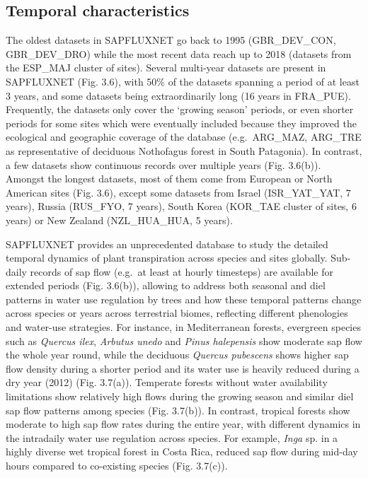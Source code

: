 \documentclass[11pt,twoside]{reedthesis}
\begin{document}
\subsection{Temporal characteristics}\label{temporal-characteristics}

The oldest datasets in SAPFLUXNET go back to 1995 (GBR\_DEV\_CON,
GBR\_DEV\_DRO) while the most recent data reach up to 2018 (datasets
from the ESP\_MAJ cluster of sites). Several multi-year datasets are
present in SAPFLUXNET (Fig. 3.6), with 50\% of the datasets spanning a
period of at least 3 years, and some datasets being extraordinarily long
(16 years in FRA\_PUE). Frequently, the datasets only cover the `growing
season' periods, or even shorter periods for some sites which were
eventually included because they improved the ecological and geographic
coverage of the database (e.g.~ARG\_MAZ, ARG\_TRE as representative of
deciduous Nothofagus forest in South Patagonia). In contrast, a few
datasets show continuous records over multiple years (Fig. 3.6(b)).
Amongst the longest datasets, most of them come from European or North
American sites (Fig. 3.6), except some datasets from Israel
(ISR\_YAT\_YAT, 7 years), Russia (RUS\_FYO, 7 years), South Korea
(KOR\_TAE cluster of sites, 6 years) or New Zealand (NZL\_HUA\_HUA, 5
years).\par 

SAPFLUXNET provides an unprecedented database to study the detailed
temporal dynamics of plant transpiration across species and sites
globally. Sub-daily records of sap flow (e.g.~at least at hourly
timesteps) are available for extended periods (Fig. 3.6(b)), allowing to
address both seasonal and diel patterns in water use regulation by trees
and how these temporal patterns change across species or years across
terrestrial biomes, reflecting different phenologies and water-use
strategies. For instance, in Mediterranean forests, evergreen species
such as \emph{Quercus ilex}, \emph{Arbutus unedo} and \emph{Pinus
halepensis} show moderate sap flow the whole year round, while the
deciduous \emph{Quercus pubescens} shows higher sap flow density during
a shorter period and its water use is heavily reduced during a dry year
(2012) (Fig. 3.7(a)). Temperate forests without water availability
limitations show relatively high flows during the growing season and
similar diel sap flow patterns among species (Fig. 3.7(b)). In contrast,
tropical forests show moderate to high sap flow rates during the entire
year, with different dynamics in the intradaily water use regulation
across species. For example, \emph{Inga} sp. in a highly diverse wet
tropical forest in Costa Rica, reduced sap flow during mid-day hours
compared to co-existing species (Fig. 3.7(c)).\par
\end{document}
